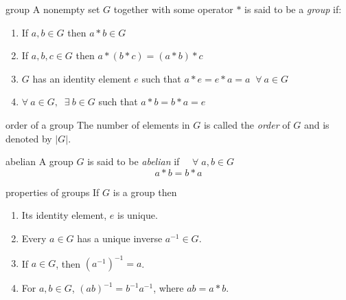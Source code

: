 \documentclass[avery5371,grid]{flashcards}
\begin{document}
\begin{flashcard}[Definition]{group}
A nonempty set $G$ together with some operator $*$ is said to be a \textit{group} if:
\begin{enumerate}
\item If $a, b \in G$ then $a*b \in G$
\item If $a, b, c \in G$ then $a*(b*c) = (a*b)*c$
\item $G$ has an identity element $e$ such that 
\mbox{$a*e=e*a=a \;\; \forall \> a \in G$}
\item $\forall \> a \in G, \;\; \exists \> b \in G $ such that
\mbox{$a*b=b*a=e$}
\end{enumerate}
\end{flashcard}

\begin{flashcard}[Definition]{order of a group}
The number of elements in $G$ is called the \textit{order} of $G$ and 
is denoted by $\vert G \vert$.
\end{flashcard}

\begin{flashcard}[Definition]{abelian}
A group $G$ is said to be \textit{abelian} if $\quad \forall \; a,b\in G$
\begin{equation*}
a*b=b*a
\end{equation*}
\end{flashcard}

\begin{flashcard}[Lemma]{properties of groups}
If $G$ is a group then
\begin{enumerate}
\item Its identity element, $e$ is unique.
\item Every $a \in G$ has a unique inverse $a^{-1} \in G$.
\item If $a \in G$, then $(a^{-1})^{-1}=a$.
\item For $a,b \in G$, \mbox{$(ab)^{-1} = b^{-1}a^{-1}$}, where
$ab=a*b$.
\end{enumerate}
\end{flashcard}
\end{document}
